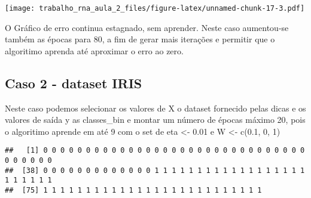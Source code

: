 \documentclass[
]{article}
\newenvironment{Shaded}{\begin{snugshade}}{\end{snugshade}}
\newcommand{\AttributeTok}[1]{\textcolor[rgb]{0.77,0.63,0.00}{#1}}
\newcommand{\DecValTok}[1]{\textcolor[rgb]{0.00,0.00,0.81}{#1}}
\newcommand{\FunctionTok}[1]{\textcolor[rgb]{0.00,0.00,0.00}{#1}}
\newcommand{\NormalTok}[1]{#1}
\newcommand{\OtherTok}[1]{\textcolor[rgb]{0.56,0.35,0.01}{#1}}
\newcommand{\SpecialCharTok}[1]{\textcolor[rgb]{0.00,0.00,0.00}{#1}}
\newcommand{\StringTok}[1]{\textcolor[rgb]{0.31,0.60,0.02}{#1}}
\begin{document}
\texttt{[image: trabalho\_rna\_aula\_2\_files/figure-latex/unnamed-chunk-17-3.pdf]}

O Gráfico de erro continua estagnado, sem aprender. Neste caso
aumentou-se também as épocas para 80, a fim de gerar mais iterações e
permitir que o algoritimo aprenda até aproximar o erro ao zero.

\hypertarget{caso-2---dataset-iris}{%
\subsection{Caso 2 - dataset IRIS}\label{caso-2---dataset-iris}}

Neste caso podemos selecionar os valores de X o dataset fornecido pelas
dicas e os valores de saída y as classes\_bin e montar um número de
épocas máximo 20, pois o algoritimo aprende em até 9 com o set de eta
\textless- 0.01 e W \textless- c(0.1, 0, 1)

\begin{Shaded}
\end{Shaded}

\begin{verbatim}
##   [1] 0 0 0 0 0 0 0 0 0 0 0 0 0 0 0 0 0 0 0 0 0 0 0 0 0 0 0 0 0 0 0 0 0 0 0 0 0
##  [38] 0 0 0 0 0 0 0 0 0 0 0 0 0 1 1 1 1 1 1 1 1 1 1 1 1 1 1 1 1 1 1 1 1 1 1 1 1
##  [75] 1 1 1 1 1 1 1 1 1 1 1 1 1 1 1 1 1 1 1 1 1 1 1 1 1 1
\end{verbatim}
\end{document}
